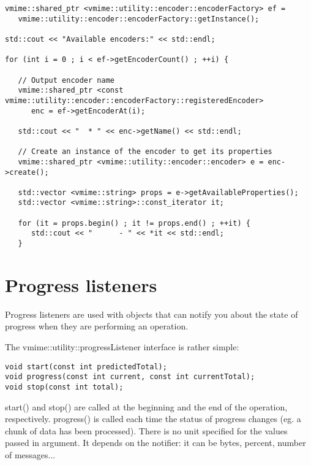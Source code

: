 \begin{lstlisting}[caption={Enumerating encoders and their properties}]
vmime::shared_ptr <vmime::utility::encoder::encoderFactory> ef =
   vmime::utility::encoder::encoderFactory::getInstance();

std::cout << "Available encoders:" << std::endl;

for (int i = 0 ; i < ef->getEncoderCount() ; ++i) {

   // Output encoder name
   vmime::shared_ptr <const vmime::utility::encoder::encoderFactory::registeredEncoder>
      enc = ef->getEncoderAt(i);

   std::cout << "  * " << enc->getName() << std::endl;

   // Create an instance of the encoder to get its properties
   vmime::shared_ptr <vmime::utility::encoder::encoder> e = enc->create();

   std::vector <vmime::string> props = e->getAvailableProperties();
   std::vector <vmime::string>::const_iterator it;

   for (it = props.begin() ; it != props.end() ; ++it) {
      std::cout << "      - " << *it << std::endl;
   }
\end{lstlisting}


\section{Progress listeners}

Progress listeners are used with objects that can notify you about the state
of progress when they are performing an operation.

The {\vcode vmime::utility::progressListener} interface is rather simple:

\begin{lstlisting}
void start(const int predictedTotal);
void progress(const int current, const int currentTotal);
void stop(const int total);
\end{lstlisting}

{\vcode start()} and {\vcode stop()} are called at the beginning and the end
of the operation, respectively. {\vcode progress()} is called each time the
status of progress changes (eg. a chunk of data has been processed). There is
no unit specified for the values passed in argument. It depends on the
notifier: it can be bytes, percent, number of messages...
